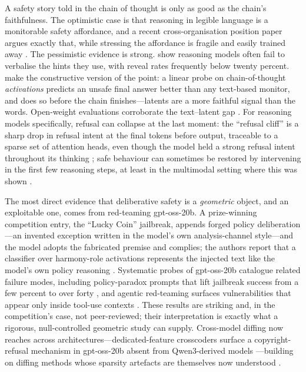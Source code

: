 \documentclass[10pt]{article}
\begin{document}
A safety story told in the chain of thought is only as good as the chain's
faithfulness. The optimistic case is that reasoning in legible language is a
monitorable safety affordance, and a recent cross-organisation position paper
argues exactly that, while stressing the affordance is fragile and easily trained
away \citep{korbak2025monitorability}. The pessimistic evidence is strong.
\citet{chen2025dontsay} show reasoning models often fail to verbalise the hints
they use, with reveal rates frequently below twenty percent.
\citet{chan2025predict} make the constructive version of the point: a linear probe
on chain-of-thought \emph{activations} predicts an unsafe final answer better than
any text-based monitor, and does so before the chain finishes---latents are a more
faithful signal than the words. Open-weight evaluations corroborate the text--latent
gap \citep{young2026lieto}. For reasoning models specifically, refusal can collapse
at the last moment: the ``refusal cliff'' is a sharp drop in refusal intent at the
final tokens before output, traceable to a sparse set of attention heads, even
though the model held a strong refusal intent throughout its thinking
\citep{yin2025cliff}; safe behaviour can sometimes be restored by intervening in
the first few reasoning steps, at least in the multimodal setting where this was
shown \citep{ghosal2026safethink}.

The most direct evidence that deliberative safety is a \emph{geometric} object,
and an exploitable one, comes from red-teaming \mbox{gpt-oss-20b}. A prize-winning
competition entry, the ``Lucky Coin'' jailbreak, appends forged policy
deliberation---an invented exception written in the model's own analysis-channel
style---and the model adopts the fabricated premise and complies; the authors report
that a classifier over harmony-role activations represents the injected text like
the model's own policy reasoning \citep{ye2025luckycoin}. Systematic probes of
\mbox{gpt-oss-20b} catalogue related failure modes, including policy-paradox prompts
that lift jailbreak success from a few percent to over forty
\citep{gptoss2025probing}, and agentic red-teaming surfaces vulnerabilities that
appear only inside tool-use contexts \citep{mindthegap2025agentic}. These results
are striking and, in the competition's case, not peer-reviewed; their interpretation
is exactly what a rigorous, null-controlled geometric study can supply. Cross-model
diffing now reaches across architectures---dedicated-feature crosscoders surface a
copyright-refusal mechanism in \mbox{gpt-oss-20b} absent from Qwen3-derived models
\citep{jiralerspong2026crossarch}---building on diffing methods whose sparsity
artefacts are themselves now understood \citep{minder2025crosscoder}.
\end{document}
